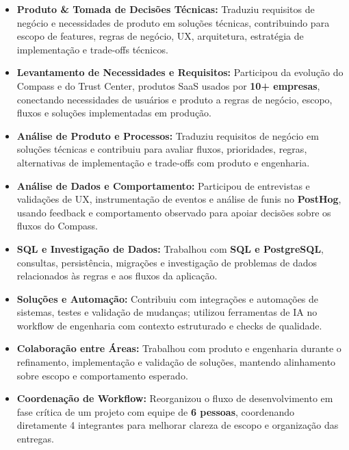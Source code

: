 \documentclass[10pt,a4paper]{article}
\begin{document}
\begin{itemize}

    \item
    \textbf{Produto \& Tomada de Decisões Técnicas:}
    Traduziu requisitos de negócio e necessidades de produto em
    soluções técnicas, contribuindo para escopo de features,
    regras de negócio, UX, arquitetura, estratégia de
    implementação e trade-offs técnicos.

    \item
    \textbf{Levantamento de Necessidades e Requisitos:}
    Participou da evolução do Compass e do Trust Center, produtos
    SaaS usados por \textbf{10+ empresas}, conectando necessidades
    de usuários e produto a regras de negócio, escopo, fluxos e
    soluções implementadas em produção.

    \item
    \textbf{Análise de Produto e Processos:}
    Traduziu requisitos de negócio em soluções técnicas e
    contribuiu para avaliar fluxos, prioridades, regras,
    alternativas de implementação e trade-offs com produto e
    engenharia.

    \item
    \textbf{Análise de Dados e Comportamento:}
    Participou de entrevistas e validações de UX, instrumentação
    de eventos e análise de funis no \textbf{PostHog}, usando
    feedback e comportamento observado para apoiar decisões sobre
    os fluxos do Compass.

    \item
    \textbf{SQL e Investigação de Dados:}
    Trabalhou com \textbf{SQL e PostgreSQL}, consultas,
    persistência, migrações e investigação de problemas de dados
    relacionados às regras e aos fluxos da aplicação.

    \item
    \textbf{Soluções e Automação:}
    Contribuiu com integrações e automações de sistemas, testes e
    validação de mudanças; utilizou ferramentas de IA no workflow
    de engenharia com contexto estruturado e checks de qualidade.

    \item
    \textbf{Colaboração entre Áreas:}
    Trabalhou com produto e engenharia durante o refinamento,
    implementação e validação de soluções, mantendo alinhamento
    sobre escopo e comportamento esperado.

    \item
    \textbf{Coordenação de Workflow:}
    Reorganizou o fluxo de desenvolvimento em fase crítica de um
    projeto com equipe de \textbf{6 pessoas}, coordenando
    diretamente 4 integrantes para melhorar clareza de escopo e
    organização das entregas.

\end{itemize}
\end{document}
